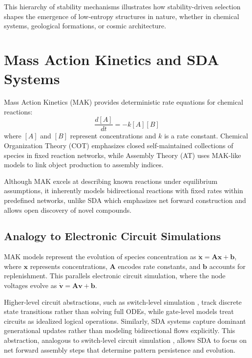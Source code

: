 \documentclass[preprint,12pt]{elsarticle}
\begin{document}
This hierarchy of stability mechanisms illustrates how stability-driven selection shapes the emergence of low-entropy structures in nature, whether in chemical systems, geological formations, or cosmic architecture.

\section{Mass Action Kinetics and SDA Systems}

Mass Action Kinetics (MAK) \cite{TuranyiTomlin2014} provides deterministic rate equations for chemical reactions:
\[
\frac{d[A]}{dt} = -k [A][B]
\]
where $[A]$ and $[B]$ represent concentrations and $k$ is a rate constant. Chemical Organization Theory (COT) \cite{heylighen2019chemical} emphasizes closed self-maintained collections of species in fixed reaction networks, while Assembly Theory (AT) uses MAK-like models to link object production to assembly indices.

Although MAK excels at describing known reactions under equilibrium assumptions, it inherently models bidirectional reactions with fixed rates within predefined networks, unlike SDA which emphasizes net forward construction and allows open discovery of novel compounds.

\subsection{Analogy to Electronic Circuit Simulations}

MAK models represent the evolution of species concentration as $\dot{\mathbf{x}} = \mathbf{A}\mathbf{x} + \mathbf{b}$, where \(\mathbf{x}\) represents concentrations, \(\mathbf{A}\) encodes rate constants, and \(\mathbf{b}\) accounts for replenishment. This parallels electronic circuit simulation, where the node voltages evolve as $\dot{\mathbf{v}} = \mathbf{A}\mathbf{v} + \mathbf{b}$.

Higher-level circuit abstractions, such as switch-level simulation \cite{AdlerCAD}, track discrete state transitions rather than solving full ODEs, while gate-level models treat circuits as idealized logical operations. Similarly, SDA systems capture dominant generational updates rather than modeling bidirectional flows explicitly. This abstraction, analogous to switch-level circuit simulation , allows SDA to focus on net forward assembly steps that determine pattern persistence and evolution.
\end{document}
